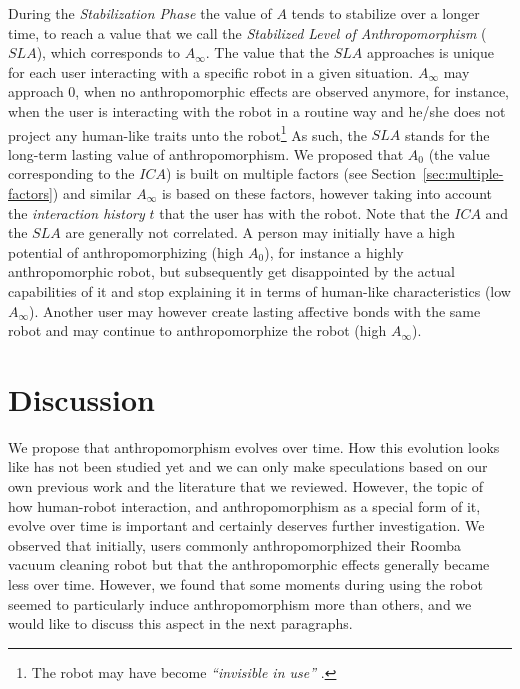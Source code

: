 \documentclass{frontiersSCNS} %
\begin{document}
During the \textit{Stabilization Phase} the value of $A$ tends to stabilize over a longer time, to reach a value that we call the \textit{Stabilized Level of Anthropomorphism} ($SLA$), which corresponds to $A_{\infty}$. The value that the $SLA$ approaches is unique for each user interacting with a specific robot in a given situation. $A_{\infty}$ may approach $0$, when no anthropomorphic effects are observed anymore, for instance, when the user is interacting with the robot in a routine way and he/she does not project any human-like traits unto the robot\footnote{The robot may have become \textit{``invisible in use''} \citep{takayama_toward_2011}.} As such, the $SLA$ stands for the long-term lasting value of anthropomorphism.
We proposed that $A_0$ (the value corresponding to the $ICA$) is built on multiple factors (see Section~\ref{sec:multiple-factors}) and similar $A_{\infty}$ is based on these factors, however taking into account the \textit{interaction history} $t$ that the user has with the robot.
Note that the $ICA$ and the $SLA$ are generally not correlated. A person may initially have a high potential of anthropomorphizing (high $A_0$), for instance a highly anthropomorphic robot, but subsequently get disappointed by the actual capabilities of it and stop explaining it in terms of human-like characteristics (low $A_{\infty}$). Another user may however create lasting affective bonds with the same robot and may continue to anthropomorphize the robot (high $A_{\infty}$).



%
%
%
%
%
%

\section{Discussion}
\label{sec:discussion}

We propose that anthropomorphism evolves over time. How this evolution looks like has not been studied yet and we can only make speculations based on our own previous work and the literature that we reviewed. However, the topic of how human-robot interaction, and anthropomorphism as a special form of it, evolve over time is important and certainly deserves further investigation.
We observed that initially, users commonly anthropomorphized their Roomba vacuum cleaning robot but that the anthropomorphic effects generally became less over time. However, we found that some moments during using the robot seemed to particularly induce anthropomorphism more than others, and we would like to discuss this aspect in the next paragraphs.
\end{document}
